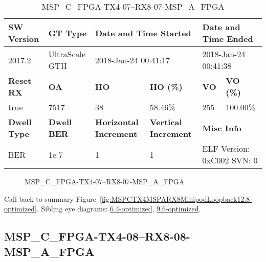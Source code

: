 \begin{table}[h]
\centering
\caption{MSP\_C\_FPGA-TX4-07--RX8-07-MSP\_A\_FPGA}
\label{tab:MSPCFPGATX407RX807MSPAFPGA12.8-optimized}
\begin{tabular}{@{}|l|l|l|l|l|l|@{}}
\toprule
\textbf{SW Version}                & \textbf{GT Type}   & \multicolumn{2}{l|}{\textbf{Date and Time Started}}            & \multicolumn{2}{l|}{\textbf{Date and Time Ended}}        \\ \midrule
2017.2                       & UltraScale GTH          & \multicolumn{2}{l|}{2018-Jan-24 00:41:17}                   & \multicolumn{2}{l|}{2018-Jan-24 00:41:38}               \\ \midrule
\textbf{Reset RX}                  & \textbf{OA} & \textbf{HO}   & \textbf{HO (\%)} & \textbf{VO} & \textbf{VO (\%)} \\ \midrule
true & 7517        & 38          & 58.46\%        & 255        & 100.00\%       \\ \midrule
\textbf{Dwell Type}                & \textbf{Dwell BER} & \textbf{Horizontal Increment} & \textbf{Vertical Increment}    & \multicolumn{2}{l|}{\textbf{Misc Info}}                  \\ \midrule
BER                            & 1e-7        & 1        & 1           & \multicolumn{2}{l|}{ELF Version: 0xC002 SVN: 0}                         \\ \bottomrule
\end{tabular}
\end{table}

\begin{figure}[h]
\caption{MSP\_C\_FPGA-TX4-07--RX8-07-MSP\_A\_FPGA} \label{fig:MSPCFPGATX407RX807MSPAFPGA12.8-optimized}
\end{figure}

Call back to summary Figure~\ref{fig:MSPCTX4MSPARX8MinipodLoopback12.8-optimized}.
Sibling eye diagrams: \hyperref[sec:MSPCFPGATX407RX807MSPAFPGA6.4-optimized]{6.4-optimized}, \hyperref[sec:MSPCFPGATX407RX807MSPAFPGA9.6-optimized]{9.6-optimized}.

\clearpage
\newpage


\subsection{MSP\_C\_FPGA-TX4-08--RX8-08-MSP\_A\_FPGA}\label{sec:MSPCFPGATX408RX808MSPAFPGA12.8-optimized}

